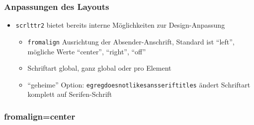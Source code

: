\documentclass[12pt,ngerman]{beamer}
\begin{document}
\begin{frame}[containsverbatim]
\frametitle{Anpassungen des Layouts}

\begin{itemize}
\item \texttt{scrlttr2} bietet bereits interne Möglichkeiten zur Design-Anpassung
\begin{itemize}
	\item \texttt{fromalign} Ausrichtung der Absender-Anschrift, Standard ist \enquote{left}, mögliche Werte \enquote{center}, \enquote{right}, \enquote{off}
	\item Schriftart global, ganz global oder pro Element
	\item \enquote{geheime} Option: \texttt{egregdoesnotlikesansseriftitles} ändert Schriftart komplett auf Serifen-Schrift
	\end{itemize}
\end{itemize}
\end{frame}

\begin{frame}
\frametitle{fromalign=center}

\vspace*{-0.75cm}\begin{center}
\end{center}

\end{frame}
\end{document}
